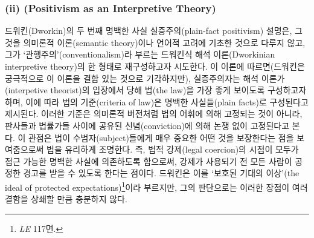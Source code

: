 \subsubsection{\texorpdfstring{(ii) (Positivism as an Interpretive
Theory)}{(ii) 해석적 이론으로서의 실증주의(Positivism as an Interpretive Theory)}}\label{ii-uxd574uxc11duxc801-uxc774uxb860uxc73cuxb85cuxc11cuxc758-uxc2e4uxc99duxc8fcuxc758positivism-as-an-interpretive-theory}

드워킨(Dworkin)의 두 번째 명백한 사실 실증주의(plain-fact positivism)
설명은, 그것을 의미론적 이론(semantic theory)이나 언어적 고려에 기초한
것으로 다루지 않고, 그가 `관행주의'(conventionalism)라 부르는 드워킨식
해석 이론(Dworkinian interpretive theory)의 한 형태로 재구성하고자
시도한다. 이 이론에 따르면(드워킨은 궁극적으로 이 이론을 결함 있는
것으로 기각하지만), 실증주의자는 해석 이론가(interpetive theorist)의
입장에서 당해 법(the law)을 가장 좋게 보이도록 구성하고자 하며, 이에
따라 법의 기준(criteria of law)은 명백한 사실들(plain facts)로
구성된다고 제시된다. 이러한 기준은 의미론적 버전처럼 법의 어휘에 의해
고정되는 것이 아니라, 판사들과 법률가들 사이에 공유된 신념(conviction)에
의해 논쟁 없이 고정된다고 본다. 이 관점은 법이 수범자(subject)들에게
매우 중요한 어떤 것을 보장한다는 점을 보여줌으로써 법을 유리하게
조명한다. 즉, 법적 강제(legal coercion)의 시점이 모두가 접근 가능한
명백한 사실에 의존하도록 함으로써, 강제가 사용되기 전 모든 사람이 공정한
경고를 받을 수 있도록 한다는 점이다. 드워킨은 이를 `보호된 기대의
이상'(the ideal of protected expectations)\footnote{\emph{LE} 117면.}이라
부르지만, 그의 판단으로는 이러한 장점이 여러 결함을 상쇄할 만큼 충분하지
않다.

